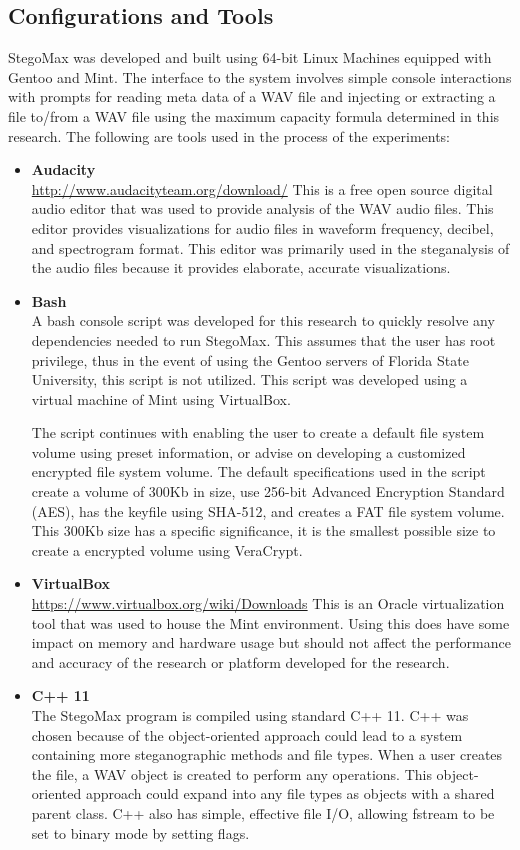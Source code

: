 \documentclass[letterpaper]{article}
\begin{document}
\subsection{Configurations and Tools}
StegoMax was developed and built using 64-bit Linux Machines equipped with Gentoo and Mint. The interface to the system involves simple console interactions with prompts for reading meta data of a WAV file and injecting or extracting a file to/from a WAV file using the maximum capacity formula determined in this research.  The following are tools used in the process of the experiments:  
\begin{itemize}
\item \textbf{Audacity}\\
\href{http://www.audacityteam.org/download/}{http://www.audacityteam.org/download/}
This is a free open source digital audio editor that was used to provide analysis of the WAV audio files. This editor provides visualizations for audio files in waveform frequency, decibel, and spectrogram format. This editor was primarily used in the steganalysis of the audio files because it provides elaborate, accurate visualizations. 

\item \textbf{Bash}\\
A bash console script was developed for this research to quickly resolve any dependencies needed to run StegoMax. This assumes that the user has root privilege, thus in the event of using the Gentoo servers of Florida State University, this script is not utilized. This script was developed using a virtual machine of Mint using VirtualBox. 

The script continues with enabling the user to create a default file system volume using preset information, or advise on developing a customized encrypted file system volume. The default specifications used in the script create a volume of 300Kb in size, use 256-bit Advanced Encryption Standard (AES), has the keyfile using SHA-512, and creates a FAT file system volume. This 300Kb size has a specific significance, it is the smallest possible size to create a encrypted volume using VeraCrypt.

\item \textbf{VirtualBox}\\
\href{https://www.virtualbox.org/wiki/Downloads}{https://www.virtualbox.org/wiki/Downloads}
This is an Oracle virtualization tool that was used to house the Mint environment. Using this does have some impact on memory and hardware usage but should not affect the performance and accuracy of the research or platform developed for the research.
\item \textbf{C++ 11}\\
The StegoMax program is compiled using standard C++ 11. C++ was chosen because of the object-oriented approach could lead to a system containing more steganographic methods and file types. When a user creates the file, a WAV object is created to perform any operations. This object-oriented approach could expand into any file types as objects with a shared parent class. C++ also has simple, effective file I/O, allowing fstream to be set to binary mode by setting flags.


\end{itemize}
\end{document}
